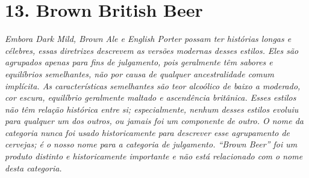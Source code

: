 \section*{13. Brown British Beer}
\textit{Embora Dark Mild, Brown Ale e English Porter possam ter histórias longas e célebres, essas diretrizes descrevem as versões modernas desses estilos. Eles são agrupados apenas para fins de julgamento, pois geralmente têm sabores e equilíbrios semelhantes, não por causa de qualquer ancestralidade comum implícita. As características semelhantes são teor alcoólico de baixo a moderado, cor escura, equilíbrio geralmente maltado e ascendência britânica. Esses estilos não têm relação histórica entre si; especialmente, nenhum desses estilos evoluiu para qualquer um dos outros, ou jamais foi um componente de outro. O nome da categoria nunca foi usado historicamente para descrever esse agrupamento de cervejas; é o nosso nome para a categoria de julgamento. “Brown Beer” foi um produto distinto e historicamente importante e não está relacionado com o nome desta categoria.}
